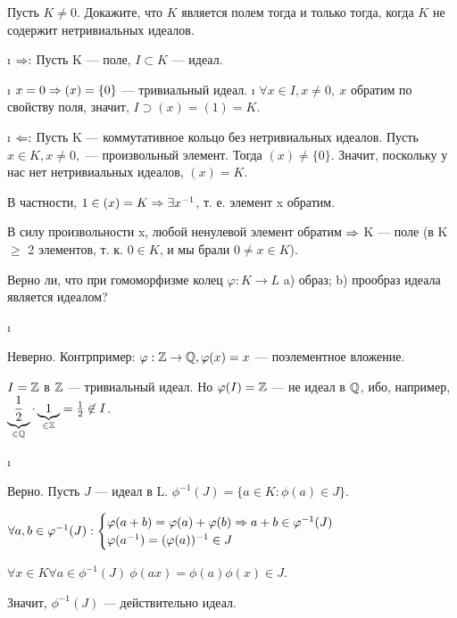 \begin{problem}[17(3.15)]
Пусть $K \neq 0$. Докажите, что $K$ является полем тогда и только тогда, когда $K$ не содержит нетривиальных идеалов.
\end{problem}

\begin{solution}

\begin{itemize}
\i
  \(\Rightarrow:\)
  Пусть K --- поле, \(I \subset K\) --- идеал.

  \begin{itemize}
  \tightlist
  \i
    \(x = 0 \Rightarrow (x) = \{0\}\) --- тривиальный идеал.
  \i
    \(\forall x \in I, x \ne 0, \ x\) обратим по свойству поля, значит, \(I \supset (x) = (1) = K\).
  \end{itemize}
\i
  \(\Leftarrow:\)
  Пусть K --- коммутативное кольцо без нетривиальных идеалов. Пусть \(x \in K, x \ne 0,\) --- произвольный элемент. Тогда \((x) \ne \{0\}\). Значит, поскольку у нас нет нетривиальных идеалов, \((x) = K\).

  В частности, \(1 \in (x) = K \Rightarrow \exists x^{-1}\), т. е. элемент x обратим.

  В силу произвольности x, любой ненулевой элемент обратим \(\Rightarrow\) K --- поле (в K \(\ge\) 2 элементов, т. к. \(0 \in K\), и мы брали \(0\ne x \in K\)).
\end{itemize}

\end{solution}

\begin{problem}[18(4.1)]
Верно ли, что при гомоморфизме колец $\varphi: K \to L$ 
a) образ; b) прообраз идеала является идеалом?
\end{problem}

\begin{enumerate}
\def\labelenumi{\alph{enumi})}
\i
  \begin{solution}
  Неверно. Контрпример: \(\varphi:\mathbb{Z} \to \mathbb{Q}, \varphi(x)=x\) --- поэлементное вложение.

  \(I=\mathbb{Z}\) в \(\mathbb{Z}\) --- тривиальный идеал. Но \(\varphi(I)=\mathbb{Z}\) --- не идеал в \(\mathbb{Q}\), ибо, например, \(\underbrace{\frac{1}{2}}_{\in \mathbb{Q}} \cdot \underbrace{1}_{\in \mathbb{Z}} = \frac{1}{2} \not\in I\).
  \end{solution}
\i
  \begin{solution}
  Верно. Пусть \(J\) --- идеал в L. \(\phi^{-1}(J) = \{a \in K : \phi(a) \in J\}\).

  \(\forall a, b \in \varphi^{-1}(J): \begin{cases} \varphi(a+b) = \varphi(a)+\varphi(b) \Rightarrow a+b \in \varphi^{-1}(J)\\ \varphi(a^{-1}) = (\varphi(a))^{-1} \in J \end{cases}\)

  \(\forall x \in K \forall a \in \phi^{-1}(J) \ \phi(ax)=\phi(a)\phi(x) \in J\).

  Значит, \(\phi^{-1}(J)\) --- действительно идеал.
  \end{solution}
\end{enumerate}

